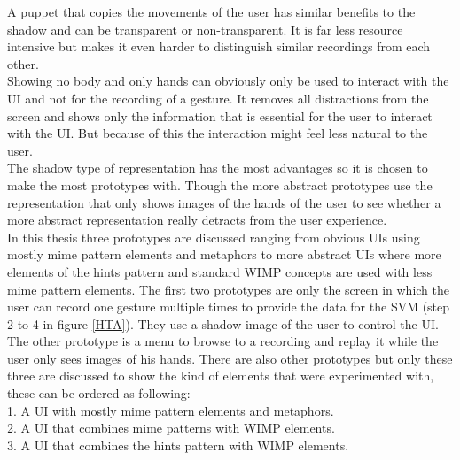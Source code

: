 A puppet that copies the movements of the user has similar benefits to the shadow and can be transparent or non-transparent. It is far less resource intensive but makes it even harder to distinguish similar recordings from each other.\\
 
Showing no body and only hands can obviously only be used to interact with the UI and not for the recording of a gesture. It removes all distractions from the screen and shows only the information that is essential for the user to interact with the UI. But because of this the interaction might feel less natural to the user.\\
 
The shadow type of representation has the most advantages so it is chosen to make the most prototypes with. Though the more abstract prototypes use the representation that only shows images of the hands of the user to see whether a more abstract representation really detracts from the user experience. \\
 
In this thesis three prototypes are discussed ranging from obvious UIs using mostly mime pattern elements and metaphors to more abstract UIs where more elements of the hints pattern and standard WIMP concepts are used with less mime pattern elements. The first two prototypes are only the screen in which the user can record one gesture multiple times to provide the data for the SVM (step 2 to 4 in figure \ref{HTA}). They use a shadow image of the user to control the UI. The other prototype is a menu to browse to a recording and replay it while the user only sees images of his hands. There are also other prototypes but only these three are discussed to show the kind of elements that were experimented with, these can be ordered as following: \\

1. A UI with mostly mime pattern elements and metaphors. \\
2. A UI that combines mime patterns with WIMP elements. \\
3. A UI that combines the hints pattern with WIMP elements.\\ \\

